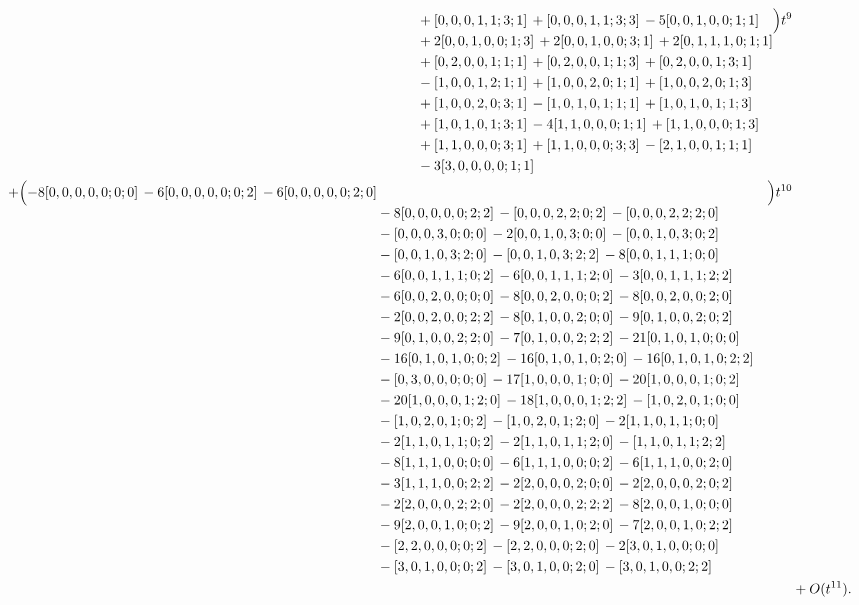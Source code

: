 \documentclass[10pt]{article}
\begin{document}
\[\begin{aligned}
\begin{aligned}[t]
  &{}+[0,0,0,1,1;3;1]\,+[0,0,0,1,1;3;3]\,-5[0,0,1,0,0;1;1] \\
  &{}+2[0,0,1,0,0;1;3]\,+2[0,0,1,0,0;3;1]\,+2[0,1,1,1,0;1;1] \\
  &{}+[0,2,0,0,1;1;1]\,+[0,2,0,0,1;1;3]\,+[0,2,0,0,1;3;1] \\
  &{}-[1,0,0,1,2;1;1]\,+[1,0,0,2,0;1;1]\,+[1,0,0,2,0;1;3] \\
  &{}+[1,0,0,2,0;3;1]\,-[1,0,1,0,1;1;1]\,+[1,0,1,0,1;1;3] \\
  &{}+[1,0,1,0,1;3;1]\,-4[1,1,0,0,0;1;1]\,+[1,1,0,0,0;1;3] \\
  &{}+[1,1,0,0,0;3;1]\,+[1,1,0,0,0;3;3]\,-[2,1,0,0,1;1;1] \\
  &{}-3[3,0,0,0,0;1;1]\end{aligned}\Bigr)t^{9} \\
  + \Bigl(\begin{aligned}[t]-8[0,0,0,0,0;0;0]\,-6[0,0,0,0,0;0;2]\,-6[0,0,0,0,0;2;0] \\
  &{}-8[0,0,0,0,0;2;2]\,-[0,0,0,2,2;0;2]\,-[0,0,0,2,2;2;0] \\
  &{}-[0,0,0,3,0;0;0]\,-2[0,0,1,0,3;0;0]\,-[0,0,1,0,3;0;2] \\
  &{}-[0,0,1,0,3;2;0]\,-[0,0,1,0,3;2;2]\,-8[0,0,1,1,1;0;0] \\
  &{}-6[0,0,1,1,1;0;2]\,-6[0,0,1,1,1;2;0]\,-3[0,0,1,1,1;2;2] \\
  &{}-6[0,0,2,0,0;0;0]\,-8[0,0,2,0,0;0;2]\,-8[0,0,2,0,0;2;0] \\
  &{}-2[0,0,2,0,0;2;2]\,-8[0,1,0,0,2;0;0]\,-9[0,1,0,0,2;0;2] \\
  &{}-9[0,1,0,0,2;2;0]\,-7[0,1,0,0,2;2;2]\,-21[0,1,0,1,0;0;0] \\
  &{}-16[0,1,0,1,0;0;2]\,-16[0,1,0,1,0;2;0]\,-16[0,1,0,1,0;2;2] \\
  &{}-[0,3,0,0,0;0;0]\,-17[1,0,0,0,1;0;0]\,-20[1,0,0,0,1;0;2] \\
  &{}-20[1,0,0,0,1;2;0]\,-18[1,0,0,0,1;2;2]\,-[1,0,2,0,1;0;0] \\
  &{}-[1,0,2,0,1;0;2]\,-[1,0,2,0,1;2;0]\,-2[1,1,0,1,1;0;0] \\
  &{}-2[1,1,0,1,1;0;2]\,-2[1,1,0,1,1;2;0]\,-[1,1,0,1,1;2;2] \\
  &{}-8[1,1,1,0,0;0;0]\,-6[1,1,1,0,0;0;2]\,-6[1,1,1,0,0;2;0] \\
  &{}-3[1,1,1,0,0;2;2]\,-2[2,0,0,0,2;0;0]\,-2[2,0,0,0,2;0;2] \\
  &{}-2[2,0,0,0,2;2;0]\,-2[2,0,0,0,2;2;2]\,-8[2,0,0,1,0;0;0] \\
  &{}-9[2,0,0,1,0;0;2]\,-9[2,0,0,1,0;2;0]\,-7[2,0,0,1,0;2;2] \\
  &{}-[2,2,0,0,0;0;2]\,-[2,2,0,0,0;2;0]\,-2[3,0,1,0,0;0;0] \\
  &{}-[3,0,1,0,0;0;2]\,-[3,0,1,0,0;2;0]\,-[3,0,1,0,0;2;2]\end{aligned}\Bigr)t^{10} \\
  &+ O(t^{11}).
\end{aligned}
\]
\end{document}
